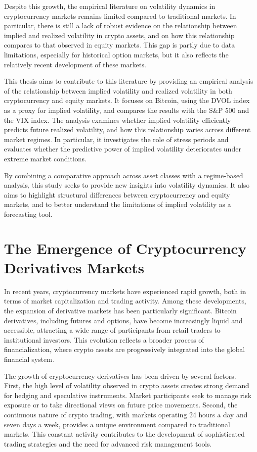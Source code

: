 \documentclass[11pt,a4paper,openany]{report}
\begin{document}
Despite this growth, the empirical literature on volatility dynamics in
cryptocurrency markets remains limited compared to traditional markets.
In particular, there is still a lack of robust evidence on the
relationship between implied and realized volatility in crypto assets,
and on how this relationship compares to that observed in equity
markets. This gap is partly due to data limitations, especially for
historical option markets, but it also reflects the relatively recent
development of these markets.

This thesis aims to contribute to this literature by providing an
empirical analysis of the relationship between implied volatility and
realized volatility in both cryptocurrency and equity markets. It
focuses on Bitcoin, using the DVOL index as a proxy for implied
volatility, and compares the results with the S\&P 500 and the VIX
index. The analysis examines whether implied volatility efficiently
predicts future realized volatility, and how this relationship varies
across different market regimes. In particular, it investigates the role
of stress periods and evaluates whether the predictive power of implied
volatility deteriorates under extreme market conditions.

By combining a comparative approach across asset classes with a
regime-based analysis, this study seeks to provide new insights into
volatility dynamics. It also aims to highlight structural differences
between cryptocurrency and equity markets, and to better understand the
limitations of implied volatility as a forecasting tool.

\section{The Emergence of Cryptocurrency Derivatives
Markets}\label{the-emergence-of-cryptocurrency-derivatives-markets}

In recent years, cryptocurrency markets have experienced rapid growth,
both in terms of market capitalization and trading activity. Among these
developments, the expansion of derivative markets has been particularly
significant. Bitcoin derivatives, including futures and options, have
become increasingly liquid and accessible, attracting a wide range of
participants from retail traders to institutional investors. This
evolution reflects a broader process of financialization, where crypto
assets are progressively integrated into the global financial system.

The growth of cryptocurrency derivatives has been driven by several
factors. First, the high level of volatility observed in crypto assets
creates strong demand for hedging and speculative instruments. Market
participants seek to manage risk exposure or to take directional views
on future price movements. Second, the continuous nature of crypto
trading, with markets operating 24 hours a day and seven days a week,
provides a unique environment compared to traditional markets. This
constant activity contributes to the development of sophisticated
trading strategies and the need for advanced risk management tools.
\end{document}
